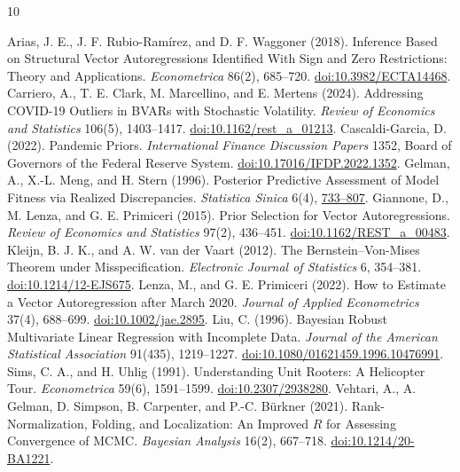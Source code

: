 \documentclass[11pt,a4paper]{article}
\begin{document}
\clearpage
\begin{thebibliography}{10}
\raggedright
 Arias, J. E., J. F. Rubio-Ram\'{i}rez, and D. F. Waggoner (2018). Inference Based on Structural Vector Autoregressions Identified With Sign and Zero Restrictions: Theory and Applications. \emph{Econometrica} 86(2), 685--720. \href{https://doi.org/10.3982/ECTA14468}{doi:10.3982/ECTA14468}.
 Carriero, A., T. E. Clark, M. Marcellino, and E. Mertens (2024). Addressing COVID-19 Outliers in BVARs with Stochastic Volatility. \emph{Review of Economics and Statistics} 106(5), 1403--1417. \href{https://doi.org/10.1162/rest_a_01213}{doi:10.1162/rest\_a\_01213}.
 Cascaldi-Garcia, D. (2022). Pandemic Priors. \emph{International Finance Discussion Papers} 1352, Board of Governors of the Federal Reserve System. \href{https://doi.org/10.17016/IFDP.2022.1352}{doi:10.17016/IFDP.2022.1352}.
 Gelman, A., X.-L. Meng, and H. Stern (1996). Posterior Predictive Assessment of Model Fitness via Realized Discrepancies. \emph{Statistica Sinica} 6(4), \href{https://sites.stat.columbia.edu/gelman/research/published/A6n41.pdf}{733--807}.
 Giannone, D., M. Lenza, and G. E. Primiceri (2015). Prior Selection for Vector Autoregressions. \emph{Review of Economics and Statistics} 97(2), 436--451. \href{https://doi.org/10.1162/REST_a_00483}{doi:10.1162/REST\_a\_00483}.
 Kleijn, B. J. K., and A. W. van der Vaart (2012). The Bernstein--Von-Mises Theorem under Misspecification. \emph{Electronic Journal of Statistics} 6, 354--381. \href{https://doi.org/10.1214/12-EJS675}{doi:10.1214/12-EJS675}.
 Lenza, M., and G. E. Primiceri (2022). How to Estimate a Vector Autoregression after March 2020. \emph{Journal of Applied Econometrics} 37(4), 688--699. \href{https://doi.org/10.1002/jae.2895}{doi:10.1002/jae.2895}.
 Liu, C. (1996). Bayesian Robust Multivariate Linear Regression with Incomplete Data. \emph{Journal of the American Statistical Association} 91(435), 1219--1227. \href{https://doi.org/10.1080/01621459.1996.10476991}{doi:10.1080/01621459.1996.10476991}.
 Sims, C. A., and H. Uhlig (1991). Understanding Unit Rooters: A Helicopter Tour. \emph{Econometrica} 59(6), 1591--1599. \href{https://doi.org/10.2307/2938280}{doi:10.2307/2938280}.
 Vehtari, A., A. Gelman, D. Simpson, B. Carpenter, and P.-C. B\"urkner (2021). Rank-Normalization, Folding, and Localization: An Improved $\widehat R$ for Assessing Convergence of MCMC. \emph{Bayesian Analysis} 16(2), 667--718. \href{https://doi.org/10.1214/20-BA1221}{doi:10.1214/20-BA1221}.
\end{thebibliography}
\end{document}
